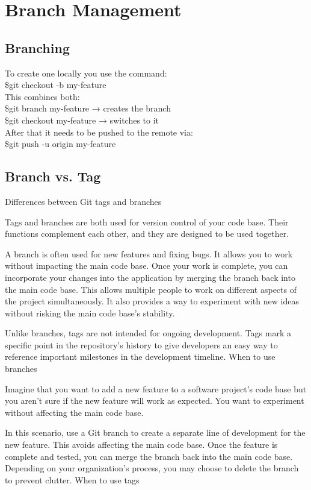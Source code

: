 \chapter{Branch Management}
\chapteroverlay
\chapterunderlay

\section{Branching}
To create one locally you use the command:\\
\$git checkout -b my-feature\\
This combines both:\\
\$git branch my-feature → creates the branch\\
\$git checkout my-feature → switches to it\\

After that it needs to be pushed to the remote via:\\
\$git push -u origin my-feature\\

\section{Branch vs. Tag}
Differences between Git tags and branches

Tags and branches are both used for version control of your code base. Their functions complement each other, and they are designed to be used together.

A branch is often used for new features and fixing bugs. It allows you to work without impacting the main code base. Once your work is complete, you can incorporate your changes into the application by merging the branch back into the main code base. This allows multiple people to work on different aspects of the project simultaneously. It also provides a way to experiment with new ideas without risking the main code base's stability.

Unlike branches, tags are not intended for ongoing development. Tags mark a specific point in the repository’s history to give developers an easy way to reference important milestones in the development timeline.
When to use branches

Imagine that you want to add a new feature to a software project’s code base but you aren’t sure if the new feature will work as expected. You want to experiment without affecting the main code base.

In this scenario, use a Git branch to create a separate line of development for the new feature. This avoids affecting the main code base. Once the feature is complete and tested, you can merge the branch back into the main code base. Depending on your organization’s process, you may choose to delete the branch to prevent clutter.
When to use tags

